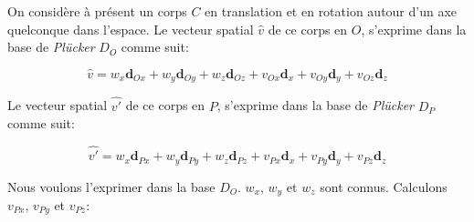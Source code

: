 On considère à présent un corps $C$ en translation et en rotation autour d'un axe quelconque dans l'espace. Le vecteur spatial $\widehat{v}$ de ce corps en $O$, s'exprime dans la base de \emph{Plücker} $D_{O}$ comme suit:

\begin{equation*}
  \widehat{v} = w_{x}\textbf{d}_{Ox} + w_{y}\textbf{d}_{Oy} + w_{z}\textbf{d}_{Oz} + v_{Ox}\textbf{d}_{x} + v_{Oy}\textbf{d}_{y} + v_{Oz}\textbf{d}_{z}
\end{equation*}

Le vecteur spatial $\widehat{v'}$ de ce corps en $P$, s'exprime dans la base de \emph{Plücker} $D_{P}$ comme suit:

\begin{equation*}
  \widehat{v'} = w_{x}\textbf{d}_{Px} + w_{y}\textbf{d}_{Py} + w_{z}\textbf{d}_{Pz} + v_{Px}\textbf{d}_{x} + v_{Py}\textbf{d}_{y} + v_{Pz}\textbf{d}_{z}
\end{equation*}

Nous voulons l'exprimer dans la base $D_{O}$. $w_{x}$, $w_{y}$ et $w_{z}$ sont connus. Calculons $v_{Px}$, $v_{Py}$ et $v_{Pz}$:


